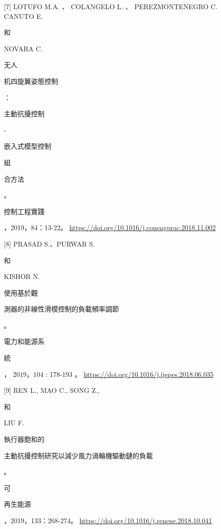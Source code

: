\documentclass[10pt]{article}
\begin{document}
[7] LOTUFO M.A. 、 COLANGELO L. 、 PEREZMONTENEGRO C. CANUTO E. \begin{CJK}{UTF8}{mj}和\end{CJK} NOVARA C. \begin{CJK}{UTF8}{mj}无人\end{CJK} \begin{CJK}{UTF8}{mj}机四旋翼姿態控制\end{CJK}：\begin{CJK}{UTF8}{mj}主動抗擾控制\end{CJK}-\begin{CJK}{UTF8}{mj}嵌入式模型控制\end{CJK} \begin{CJK}{UTF8}{mj}組\end{CJK} \begin{CJK}{UTF8}{mj}合方法\end{CJK}。\begin{CJK}{UTF8}{mj}控制工程實踐\end{CJK}，2019，84：13-22。 \href{https://doi.org/10.1016/j.conengprac.2018.11.002}{https://doi.org/10.1016/j.conengprac.2018.11.002}

[8] PRASAD S.、PURWAR S. \begin{CJK}{UTF8}{mj}和\end{CJK} KISHOR N. \begin{CJK}{UTF8}{mj}使用基於觀\end{CJK} \begin{CJK}{UTF8}{mj}測器的非線性滑模控制的負載頻率調節\end{CJK}。\begin{CJK}{UTF8}{mj}電力和能源系\end{CJK} \begin{CJK}{UTF8}{mj}統\end{CJK} ， $2019 ， 104$ : 178-193 。 \href{https://doi.org/10.1016/j.ijepes.2018.06.035}{https://doi.org/10.1016/j.ijepes.2018.06.035}

[9] REN L., MAO C., SONG Z., \begin{CJK}{UTF8}{mj}和\end{CJK} LIU F. \begin{CJK}{UTF8}{mj}執行器飽和的\end{CJK} \begin{CJK}{UTF8}{mj}主動抗擾控制研究以減少風力渦輪機驅動鏈的負載\end{CJK}。\begin{CJK}{UTF8}{mj}可\end{CJK} \begin{CJK}{UTF8}{mj}再生能源\end{CJK}，2019，133：268-274。 \href{https://doi.org/10.1016/j.renene.2018.10.041}{https://doi.org/10.1016/j.renene.2018.10.041}
\end{document}
